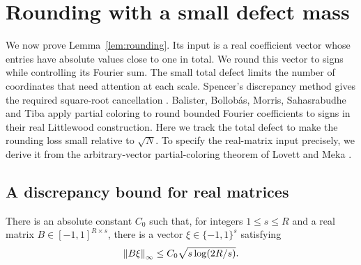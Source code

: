 \section{Rounding with a small defect mass}\label{sec:rounding}

We now prove Lemma~\ref{lem:rounding}.  Its input is a real coefficient
vector whose entries have absolute values close to one in total.  We round
this vector to signs while controlling its Fourier sum.  The small total
defect limits the number of coordinates that need attention at each scale.
Spencer's discrepancy method gives the required square-root cancellation
\cite{Spencer1985}.  Balister, Bollob\'as, Morris, Sahasrabudhe and Tiba
\cite[Sections~4--5]{BalisterEtAl2020} apply partial coloring to round
bounded Fourier coefficients to signs in their real Littlewood
construction.  Here we track the total defect to make the rounding loss
small relative to $\sqrt N$.  To specify the real-matrix input precisely, we derive
it from the arbitrary-vector partial-coloring theorem of Lovett and Meka
\cite[Theorem~4 in the cited preprint version]{LovettMeka2015}.

\subsection{A discrepancy bound for real matrices}

\begin{lemma}\label{lem:rounding-matrix}
There is an absolute constant $C_0$ such that, for integers $1\le s\le R$
and a real matrix $B\in[-1,1]^{R\times s}$, there is a vector
$\xi\in\{-1,1\}^s$ satisfying
\[
 \left\lVert B\xi\right\rVert_\infty\le C_0\sqrt{s\log(2R/s)}.
\]
\end{lemma}

